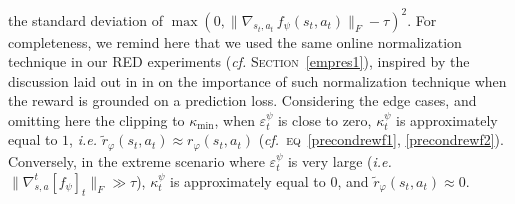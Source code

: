 the standard deviation of
$\max (0, \lVert \nabla_{s_t,a_t} \, f_\psi (s_t,a_t) \rVert _F - \tau)^2$.
For completeness, we remind here that we used the same online normalization technique
in our RED experiments
(\textit{cf.} \textsc{Section}~\ref{empres1}),
inspired by the discussion laid out in in \cite{Burda2018-vl}
on the importance of such normalization technique
when the reward is grounded on a prediction loss.
Considering the edge cases, and omitting here the clipping to $\kappa_\text{min}$,
when $\varepsilon_t^\psi$ is close to zero,
$\kappa_t^\psi$ is approximately equal to $1$,
\textit{i.e.} $\tilde{r}_\varphi (s_t,a_t) \approx r_\varphi (s_t,a_t)$
(\textit{cf.}~\textsc{eq}~\ref{precondrewf1}, \ref{precondrewf2}).
Conversely, in the extreme scenario where $\varepsilon_t^\psi$ is very large
(\textit{i.e.}~$\lVert\nabla_{s,a}^t[f_\psi]_t\rVert _F \gg \tau$),
$\kappa_t^\psi$ is approximately equal to $0$,
and $\tilde{r}_\varphi (s_t,a_t) \approx 0$.


